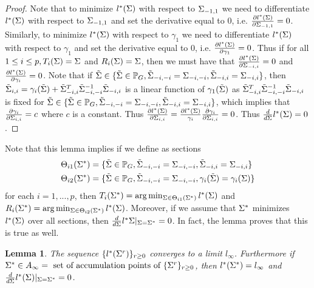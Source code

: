 \documentclass[12pt, leqno]{article}
\def\s{\ensuremath\Sigma}
\def\pg{\ensuremath\mathbb{P}_{{G}}}
\newtheorem{lemma}{Lemma}[]
\begin{document}
\begin{proof}
Note that to minimize $l^*(\s)$ with respect to $\s_{-1,1}$ we need to differentiate $l^*(\s)$ with
respect to $\s_{-1,1}$ and set the derivative equal to
0, i.e. $\frac{\partial l^*(\s)}{\partial \s_{-1,1}} = 0$. Similarly,  to minimize $l^*(\s)$ with respect to $\gamma_1$ we need to differentiate $l^*(\s)$ with
respect to $\gamma_1$ and set the derivative equal to
0, i.e. $\frac{\partial l^*(\s)}{\partial \gamma_1} = 0$. Thus if for
all $1 \leq i \leq p, T_i(\s) = \s$ and $R_i(\s) = \s$, then we must
have that $\frac{\partial l^*(\s)}{\partial \s_{-i,i}} = 0$ and 
$\frac{\partial l^*(\s)}{\partial \gamma_i} = 0$. Note that if
$\tilde{\s} \in \{ \tilde{\s} \in \pg,\tilde{\s}_{-i,-i} =
    {\s}_{-i,-i}, \tilde{\s}_{-i,i} =
    {\s}_{-i,i} \}$, then $\tilde{\s}_{i,i} = \gamma_i(\tilde{\s}) +
    \tilde{\s}_{-i,i}^T \tilde{\s}_{-i,-i}^{-1} \tilde{\s}_{-i,i}$ is
    a linear function of $\gamma_1(\tilde{\s})$ as
    $\tilde{\s}_{-i,i}^T \tilde{\s}_{-i,-i}^{-1} \tilde{\s}_{-i,i}$ is
    fixed for $\tilde{\s} \in \{ \tilde{\s} \in \pg,\tilde{\s}_{-i,-i} =
    {\s}_{-i,-i}, \tilde{\s}_{-i,i} =
    {\s}_{-i,i} \}$, which implies that $\frac{\partial
      \gamma_i}{\partial {\s}_{i,i}} = c$ where $c$ is a
    constant. Thus $\frac{\partial l^*(\s)}{\partial {\s}_{i,i}} =
    \frac{\partial l^*(\s)}{\gamma_i} \frac{\partial
      \gamma_i}{\partial {\s}_{i,i}}  =0$. Thus $\frac{d}{d \s}l^*(\s) = 0$.
\end{proof}
Note that this lemma implies if we define as 
sections 
\begin{align*}
\Theta_{i1}(\s^*) &= \{\tilde{\s} \in \pg,\tilde{\s}_{-i,-i} =
    {\s}_{-i,-i}, \tilde{\s}_{-i,i} =
    {\s}_{-i,i}\} \\
\Theta_{i2}(\s^*) &= \{\tilde{\s} \in \pg,\tilde{\s}_{-i,-i} =
    {\s}_{-i,-i}, \gamma_i(\tilde{\s})=\gamma_i({\s})\}
\end{align*} 
for each $i=1,...,p$, then $T_i(\s^*) = \arg\min_{\s
  \in \Theta_{i1}(\s^*)} l^*(\s)$ and $R_i(\s^*) = \arg\min_{\s
  \in \Theta_{i2}(\s^*)} l^*(\s)$. Moreover, if we assume that $\s^*$ minimizes $l^*(\s)$ over
all sections, then $\frac{d}{d\s}l^*{\s}|_{\s=\s^*} = 0$. In fact, the
lemma proves that this is true as well.
\begin{lemma} \label{lemma:linfty}
The sequence $\{l^*(\s^r)\}_{r \geq 0}$ converges to a limit
$l_{\infty}$. Furthermore if $\s^* \in A_{\infty} = \text{ set of accumulation points of } \{\s^r\}_{r \geq 0}$,  then $l^*(\s^*) =
l_{\infty}$ and $\frac{d}{d\s}l^*(\s)|_{\s=\s^*} = 0$.
\end{lemma}
\end{document}
